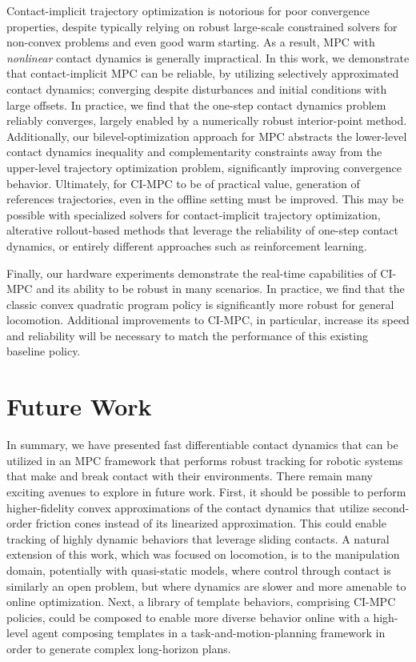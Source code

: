 Contact-implicit trajectory optimization \cite{posa2014direct, manchester2020variational} is notorious for poor convergence properties, despite typically relying on robust large-scale constrained solvers for non-convex problems and even good warm starting. As a result, MPC with \textit{nonlinear} contact dynamics is generally impractical. In this work, we demonstrate that contact-implicit MPC can be reliable, by utilizing selectively approximated contact dynamics; converging despite disturbances and initial conditions with large offsets. In practice, we find that the one-step contact dynamics problem reliably converges, largely enabled by a numerically robust interior-point method. Additionally, our bilevel-optimization approach for MPC abstracts the lower-level contact dynamics inequality and complementarity constraints away from the upper-level trajectory optimization problem, significantly improving convergence behavior. Ultimately, for CI-MPC to be of practical value, generation of references trajectories, even in the offline setting must be improved. This may be possible with specialized solvers for contact-implicit trajectory optimization, alterative rollout-based methods that leverage the reliability of one-step contact dynamics, or entirely different approaches such as reinforcement learning.

Finally, our hardware experiments demonstrate the real-time capabilities of CI-MPC and its ability to be robust in many scenarios. In practice, we find that the classic convex quadratic program policy \cite{bledt2017policy} is significantly more robust for general locomotion. Additional improvements to CI-MPC, in particular, increase its speed and reliability will be necessary to match the performance of this existing baseline policy.

\section{Future Work} \label{cipc_future_work}
In summary, we have presented fast differentiable contact dynamics that can be utilized in an MPC framework that performs robust tracking for robotic systems that make and break contact with their environments. There remain many exciting avenues to explore in future work. First, it should be possible to perform higher-fidelity convex approximations of the contact dynamics that utilize second-order friction cones instead of its linearized approximation. This could enable tracking of highly dynamic behaviors that leverage sliding contacts. A natural extension of this work, which was focused on locomotion, is to the manipulation domain, potentially with quasi-static models, where control through contact is similarly an open problem, but where dynamics are slower and more amenable to online optimization. Next, a library of template behaviors, comprising CI-MPC policies, could be composed to enable more diverse behavior online with a high-level agent composing templates in a task-and-motion-planning framework in order to generate complex long-horizon plans.

